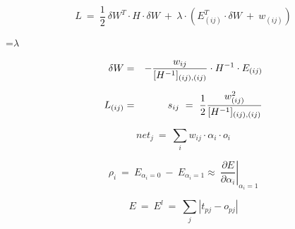 {\newpage
\clearpage
\samepage \begin{equation}L\ =\ \frac{1}{2}\ \delta W^T \cdot H \cdot \delta W
\ +\ \lambda\cdot (E_{(ij)}^T \cdot \delta W\ +\ w_{(ij)})
\end{equation}
}

{\newpage
\clearpage
\samepage \setbox\sizebox=\hbox{$\lambda$}\box\sizebox
}

{\newpage
\clearpage
\samepage \begin{eqnarray}\delta W & = & - \frac{w_{ij}}{[H^{-1}]_{(ij),(ij)}} \cdot H^{-1} \cdot
E_{(ij)} \label{obsgewver} \\ 
L_{(ij)} & = & s_{ij}\ =\ \frac{1}{2} \frac{w_{(ij)}^2}{[H^{-1}]_{(ij),(ij)}}
\mbox{\rule{0mm}{8mm}}
\end{eqnarray}
}

{\newpage
\clearpage
\samepage \begin{equation}%
net_j\ =\ \sum_i w_{ij} \cdot \alpha_i \cdot o_i
\end{equation}
}

{\newpage
\clearpage
\samepage \begin{figure}[htbp]
\begin{center}
  \begin{minipage}{\textwidth}
  \end{minipage}

\label{prskel}
\end{center}
\end{figure}
}

{\newpage
\clearpage
\samepage \begin{equation}%
\rho_i\ =\ E_{\alpha_i = 0}\ -\ E_{\alpha_i = 1} \approx\ 
\left. \frac{\partial E}{\partial \alpha_i} \right|_{\alpha_i = 1}
\end{equation}
}

{\newpage
\clearpage
\samepage \begin{equation}E\ =\ E^l\ =\ \sum_j | t_{pj} - o_{pj} |
\end{equation}
}

{\newpage
\clearpage
\samepage \begin{figure}[htbp]
\begin{center}
  \begin{minipage}{\textwidth}
  \end{minipage}

\label{prpanel}
\end{center}
\end{figure}
}

